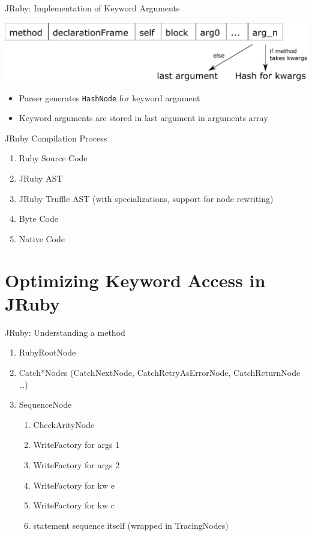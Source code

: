 \documentclass[xcolor=dvipsname,handout]{beamer} %
\begin{document}
\begin{frame}{JRuby: Implementation of Keyword Arguments}
\begin{table}
    \centering
    \includegraphics[width=\textwidth]{method_args_array.pdf}
\end{table}

\begin{itemize}
    \item Parser generates \lstinline{HashNode} for keyword argument
    \item Keyword arguments are stored in last argument in arguments array
\end{itemize}
\end{frame}

\begin{frame}{JRuby Compilation Process}
\begin{enumerate}
    \item Ruby Source Code
    \item JRuby AST
    \item JRuby Truffle AST (with specializations, support for node rewriting)
    \item Byte Code
    \item Native Code 
\end{enumerate}
\end{frame}

\section{Optimizing Keyword Access in JRuby}
\begin{frame}{JRuby: Understanding a method}
\begin{enumerate}
 \item RubyRootNode
 \item Catch*Nodes (CatchNextNode, CatchRetryAsErrorNode, CatchReturnNode \dots)
 \item SequenceNode \begin{enumerate}
    \item CheckArityNode
    \item WriteFactory for args 1
    \item WriteFactory for args 2
    \item WriteFactory for kw e
    \item WriteFactory for kw c
    \item statement sequence itself (wrapped in TracingNodes)
  \end{enumerate}
\end{enumerate}

\end{frame}
\end{document}
